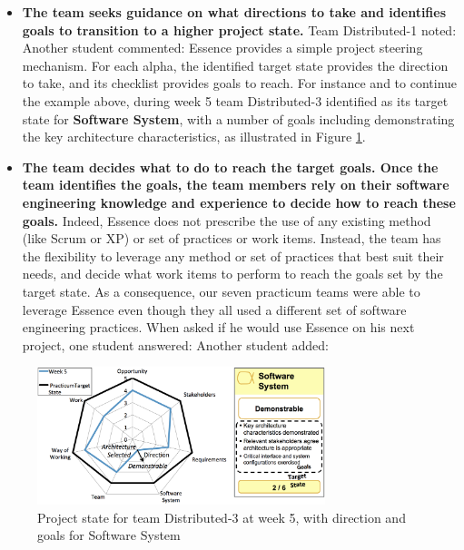 \begin{itemize}
    \item \textbf{The team seeks guidance on what directions to take and identifies goals to transition to a higher project state.} Team Distributed-1 noted:  Another student commented:  Essence provides a simple project steering mechanism. For each alpha, the identified target state provides the direction to take, and its checklist provides goals to reach. For instance and to continue the example above, during week 5 team Distributed-3 identified  as its target state for \textbf{Software System}, with a number of goals including demonstrating the key architecture characteristics, as illustrated in Figure \ref{ProjectStateDistributed3}.
    
    \item \textbf{The team decides what to do to reach the target goals. Once the team identifies the goals, the team members rely on their software engineering knowledge and experience to decide how to reach these goals.} Indeed, Essence does not prescribe the use of any existing method (like Scrum or XP) or set of practices or work items. Instead, the team has the flexibility to leverage any method or set of practices that best suit their needs, and decide what work items to perform to reach the goals set by the target state. As a consequence, our seven practicum teams were able to leverage Essence even though they all used a different set of software engineering practices. When asked if he would use Essence on his next project, one student answered:  Another student added: 
\end{itemize}

\begin{figure}[t]
\centering
\includegraphics[width=3.30in]{project_steering_images/ProjectStateDistributed3.png}
\caption{Project state for team Distributed-3 at week 5, with direction and goals for Software System}
\label{ProjectStateDistributed3}
\end{figure}


